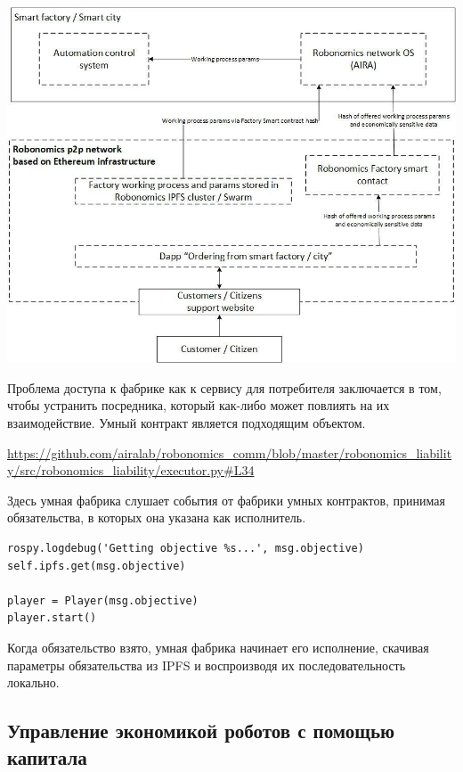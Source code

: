\documentclass{article}
\begin{document}
\includegraphics[width=1\textwidth]{app-2.png} 

Проблема доступа к фабрике как к сервису для потребителя заключается в том, чтобы устранить посредника, который как-либо может повлиять на их взаимодействие. Умный контракт является подходящим объектом.

\url{https://github.com/airalab/robonomics_comm/blob/master/robonomics_liability/src/robonomics_liability/executor.py#L34}

Здесь умная фабрика слушает события от фабрики умных контрактов, принимая обязательства, в которых она указана как исполнитель.

\begin{lstlisting}
rospy.logdebug('Getting objective %s...', msg.objective)
self.ipfs.get(msg.objective)

player = Player(msg.objective)
player.start()
\end{lstlisting}

Когда обязательство взято, умная фабрика начинает его исполнение, скачивая параметры обязательства из IPFS и воспроизводя их последовательность локально.

\subsection{Управление экономикой роботов с помощью капитала}
\end{document}
